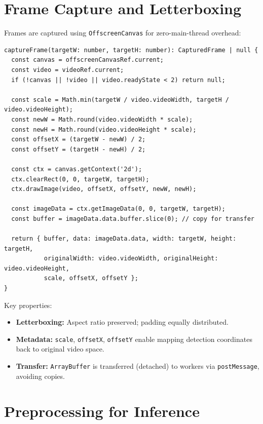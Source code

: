 \section{Frame Capture and Letterboxing}
\label{sec:frame-capture}

Frames are captured using \texttt{OffscreenCanvas} for zero-main-thread overhead:

\begin{lstlisting}[style=typescript, caption={Frame capture in useOffscreenCanvas.ts}]
captureFrame(targetW: number, targetH: number): CapturedFrame | null {
  const canvas = offscreenCanvasRef.current;
  const video = videoRef.current;
  if (!canvas || !video || video.readyState < 2) return null;

  const scale = Math.min(targetW / video.videoWidth, targetH / video.videoHeight);
  const newW = Math.round(video.videoWidth * scale);
  const newH = Math.round(video.videoHeight * scale);
  const offsetX = (targetW - newW) / 2;
  const offsetY = (targetH - newH) / 2;

  const ctx = canvas.getContext('2d');
  ctx.clearRect(0, 0, targetW, targetH);
  ctx.drawImage(video, offsetX, offsetY, newW, newH);

  const imageData = ctx.getImageData(0, 0, targetW, targetH);
  const buffer = imageData.data.buffer.slice(0); // copy for transfer

  return { buffer, data: imageData.data, width: targetW, height: targetH,
           originalWidth: video.videoWidth, originalHeight: video.videoHeight,
           scale, offsetX, offsetY };
}
\end{lstlisting}

Key properties:
\begin{itemize}
    \item \textbf{Letterboxing:} Aspect ratio preserved; padding equally distributed.
    \item \textbf{Metadata:} \texttt{scale}, \texttt{offsetX}, \texttt{offsetY} enable mapping detection coordinates back to original video space.
    \item \textbf{Transfer:} \texttt{ArrayBuffer} is transferred (detached) to workers via \texttt{postMessage}, avoiding copies.
\end{itemize}

\section{Preprocessing for Inference}
\label{sec:preprocessing}


